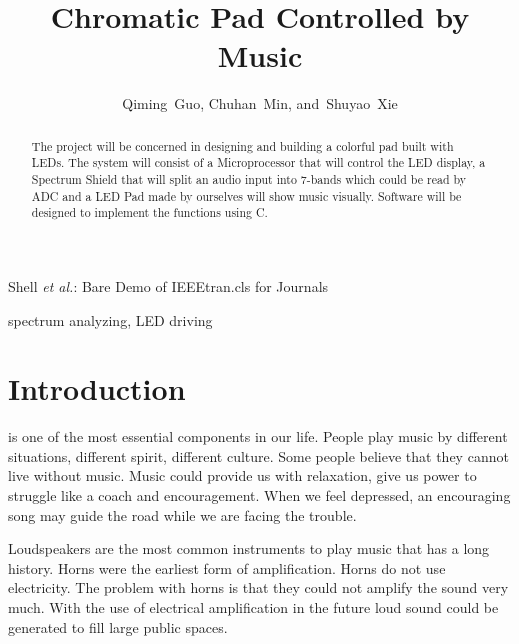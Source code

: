 \documentclass[12pt,a4paper,journal]{IEEEtran}
\begin{document}
\title{Chromatic Pad Controlled by Music}


\author{Qiming~Guo,
        Chuhan~Min,
        and~Shuyao~Xie%
        }


%
{Shell \MakeLowercase{\textit{et al.}}: Bare Demo of IEEEtran.cls for Journals}

\maketitle

\begin{abstract}
The project will be concerned in designing and building a colorful pad built with LEDs. The system will consist of a Microprocessor that will control the LED display, a Spectrum Shield that will split an audio input into 7-bands which could be read by ADC and a LED Pad made by ourselves will show music visually. Software will be designed to implement the functions using C. 
\end{abstract}

\begin{IEEEkeywords}
spectrum analyzing, LED driving
\end{IEEEkeywords}

\section{Introduction}
 is one of the most essential components in our life. People play music by different situations, different spirit, different culture. Some people believe that they cannot live without music. Music could provide us with relaxation, give us power to struggle like a coach and encouragement. When we feel depressed, an encouraging song may guide the road while we are facing the trouble.

Loudspeakers are the most common instruments to play music that has a long history. Horns were the earliest form of amplification. Horns do not use electricity. The problem with horns is that they could not amplify the sound very much. With the use of electrical amplification in the future loud sound could be generated to fill large public spaces.
\end{document}
